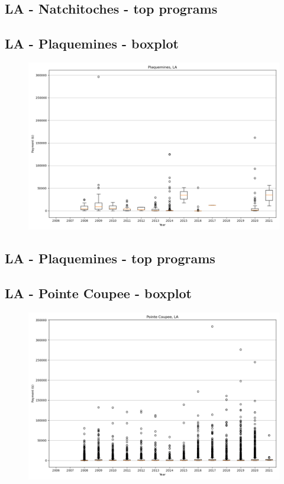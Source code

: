 \subsection*{LA - Natchitoches - top programs}

\newpage
\subsection*{LA - Plaquemines - boxplot}
\begin{figure}[h]
\centering
\includegraphics[width=7in]{../output/boxplots/counties/Plaquemines-LA_boxplot.png}
\end{figure}


\subsection*{LA - Plaquemines - top programs}

\newpage
\subsection*{LA - Pointe Coupee - boxplot}
\begin{figure}[h]
\centering
\includegraphics[width=7in]{../output/boxplots/counties/Pointe Coupee-LA_boxplot.png}
\end{figure}


